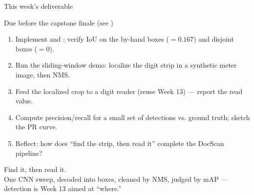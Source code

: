 \documentclass[10pt,aspectratio=169]{beamer}
\begin{document}
\begin{frame}{This week's deliverable}
  \begin{alertblock}{Due before the capstone finale (see )}
    \begin{enumerate}
      \item Implement  and ; verify IoU on the by-hand boxes ($=0.167$) and disjoint boxes ($=0$).
      \item Run the sliding-window demo: localize the digit strip in a synthetic meter image, then NMS.
      \item Feed the localized crop to a digit reader (reuse Week 13) --- report the read value.
      \item Compute precision/recall for a small set of detections vs. ground truth; sketch the PR curve.
      \item Reflect: how does ``find the strip, then read it'' complete the DocScan pipeline?
    \end{enumerate}
  \end{alertblock}
\end{frame}

\begin{frame}[standout]
  Find it, then read it.\\[4pt]
  \normalsize One CNN sweep, decoded into boxes, cleaned by NMS, judged by mAP --- detection is Week 13 aimed at ``where.''
\end{frame}
\end{document}
